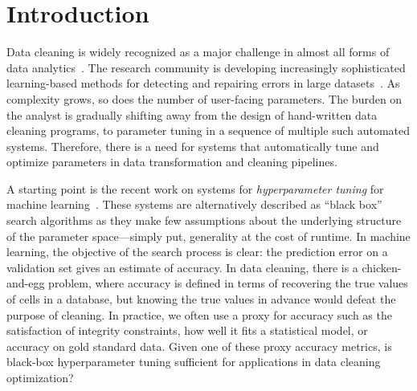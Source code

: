 \section{Introduction}\label{intro}\sloppy
Data cleaning is widely recognized as a major challenge in almost all forms of data analytics~\cite{nytimes}. 
The research community is developing increasingly sophisticated learning-based methods for detecting and repairing errors in large datasets~\cite{dc, rekatsinas2017holoclean, DBLP:journals/pvldb/KrishnanWWFG16, DBLP:conf/sigmod/ChuIKW16, mudgal2018deep, doan2018toward}.
As complexity grows, so does the number of user-facing parameters.
The burden on the analyst is gradually shifting away from the design of hand-written data cleaning programs, to parameter tuning in a sequence of multiple such automated systems.
Therefore, there is a need for systems that automatically tune and optimize parameters in data transformation and cleaning pipelines.

A starting point is the recent work on systems for \emph{hyperparameter tuning} for machine learning~\cite{li2017hyperband, sparks2017keystoneml, baylor2017tfx, golovin2017google, liaw2018tune}.
These systems are alternatively described as ``black box'' search algorithms as they make few assumptions about the underlying structure of the parameter space---simply put, generality at the cost of runtime.
In machine learning, the objective of the search process is clear: the prediction error on a validation set gives an estimate of accuracy. 
In data cleaning, there is a chicken-and-egg problem, where accuracy is defined in terms of recovering the true values of cells in a database, but knowing the true values in advance would defeat the purpose of cleaning.
In practice, we often use a proxy for accuracy such as the satisfaction of integrity constraints, how well it fits a statistical model, or accuracy on gold standard data.
Given one of these proxy accuracy metrics, is black-box hyperparameter tuning sufficient for applications in data cleaning optimization?

